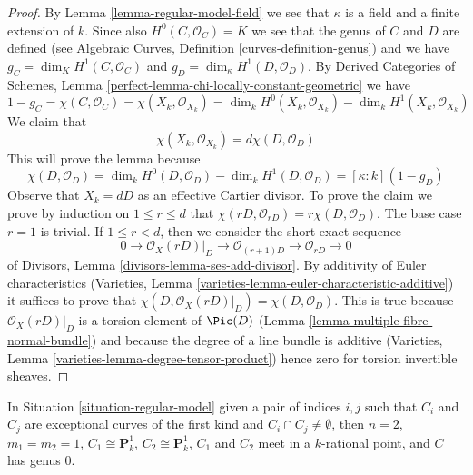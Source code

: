 \begin{proof}
By Lemma \ref{lemma-regular-model-field} we see that $\kappa$ is a field
and a finite extension of $k$. Since also $H^0(C, \mathcal{O}_C) = K$
we see that the genus of $C$ and $D$ are defined (see
Algebraic Curves, Definition \ref{curves-definition-genus}) and
we have $g_C = \dim_K H^1(C, \mathcal{O}_C)$ and
$g_D = \dim_\kappa H^1(D, \mathcal{O}_D)$.
By Derived Categories of Schemes, Lemma
\ref{perfect-lemma-chi-locally-constant-geometric}
we have
$$
1 - g_C = \chi(C, \mathcal{O}_C) =
\chi(X_k, \mathcal{O}_{X_k}) = \dim_k H^0(X_k, \mathcal{O}_{X_k})
- \dim_k H^1(X_k, \mathcal{O}_{X_k})
$$
We claim that
$$
\chi(X_k, \mathcal{O}_{X_k}) = d \chi(D, \mathcal{O}_D)
$$
This will prove the lemma because
$$
\chi(D, \mathcal{O}_D) =
\dim_k H^0(D, \mathcal{O}_D) - \dim_k H^1(D, \mathcal{O}_D) =
[\kappa : k](1 - g_D)
$$
Observe that $X_k = dD$ as an effective Cartier divisor.
To prove the claim we prove by induction on $1 \leq r \leq d$ that
$\chi(rD, \mathcal{O}_{rD}) = r \chi(D, \mathcal{O}_D)$.
The base case $r = 1$ is trivial. If $1 \leq r < d$, then we consider
the short exact sequence
$$
0 \to \mathcal{O}_X(rD)|_D \to \mathcal{O}_{(r + 1)D} \to
\mathcal{O}_{rD} \to 0
$$
of Divisors, Lemma \ref{divisors-lemma-ses-add-divisor}. By additivity
of Euler characteristics
(Varieties, Lemma \ref{varieties-lemma-euler-characteristic-additive})
it suffices to prove that
$\chi(D, \mathcal{O}_X(rD)|_D) = \chi(D, \mathcal{O}_D)$.
This is true because $\mathcal{O}_X(rD)|_D$ is a torsion
element of $\Pic(D)$ (Lemma \ref{lemma-multiple-fibre-normal-bundle})
and because the degree of a line bundle is additive
(Varieties, Lemma \ref{varieties-lemma-degree-tensor-product})
hence zero for torsion invertible sheaves.
\end{proof}

\begin{lemma}
\label{lemma-exceptional-curves-dont-meet}
In Situation \ref{situation-regular-model} given a pair of indices $i, j$
such that $C_i$ and $C_j$ are exceptional curves of the first kind
and $C_i \cap C_j \not = \emptyset$, then
$n = 2$, $m_1 = m_2 = 1$, $C_1 \cong \mathbf{P}^1_k$,
$C_2 \cong \mathbf{P}^1_k$, $C_1$ and $C_2$ meet in a $k$-rational point,
and $C$ has genus $0$.
\end{lemma}

